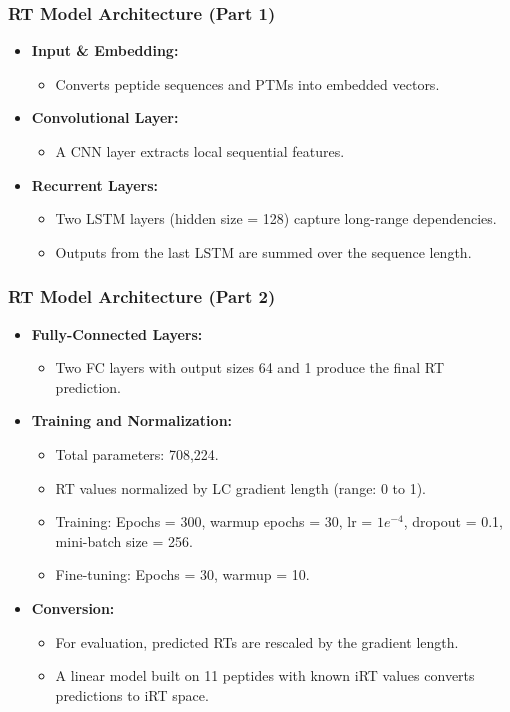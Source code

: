 \documentclass{beamer}
\begin{document}
\begin{frame}
  \frametitle{RT Model Architecture (Part 1)}
  \begin{itemize}
    \item \textbf{Input \& Embedding:}
      \begin{itemize}
        \item Converts peptide sequences and PTMs into embedded vectors.
      \end{itemize}
    \item \textbf{Convolutional Layer:}
      \begin{itemize}
        \item A CNN layer extracts local sequential features.
      \end{itemize}
    \item \textbf{Recurrent Layers:}
      \begin{itemize}
        \item Two LSTM layers (hidden size = 128) capture long-range dependencies.
        \item Outputs from the last LSTM are summed over the sequence length.
      \end{itemize}
  \end{itemize}
\end{frame}

\begin{frame}
  \frametitle{RT Model Architecture (Part 2)}
  \begin{itemize}
    \item \textbf{Fully-Connected Layers:}
      \begin{itemize}
        \item Two FC layers with output sizes 64 and 1 produce the final RT prediction.
      \end{itemize}
    \item \textbf{Training and Normalization:}
      \begin{itemize}
        \item Total parameters: 708,224.
        \item RT values normalized by LC gradient length (range: 0 to 1).
        \item Training: Epochs = 300, warmup epochs = 30, lr = $1e^{-4}$, dropout = 0.1, mini-batch size = 256.
        \item Fine-tuning: Epochs = 30, warmup = 10.
      \end{itemize}
    \item \textbf{Conversion:}
      \begin{itemize}
        \item For evaluation, predicted RTs are rescaled by the gradient length.
        \item A linear model built on 11 peptides with known iRT values converts predictions to iRT space.
      \end{itemize}
  \end{itemize}
\end{frame}
\end{document}
